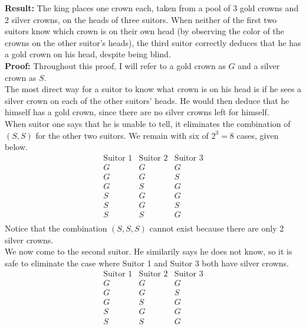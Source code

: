 \documentclass[11pt]{article}
\begin{document}
    \textbf{Result:} The king places one crown each, taken from a pool of 3 gold crowns and 2 silver crowns, on the heads of three suitors. When neither of the first two suitors know which crown is on their own head (by observing the color of the crowns on the other suitor's heads), the third suitor correctly deduces that he has a gold crown on his head, despite being blind.\\

    \textbf{Proof:} Throughout this proof, I will refer to a gold crown as $G$ and a silver crown as $S$.\\
    The most direct way for a suitor to know what crown is on his head is if he sees a silver crown on each of the other suitors' heads. He would then deduce that he himself has a gold crown, since there are no silver crowns left for himself. \\
    When suitor one says that he is unable to tell, it eliminates the combination of $(S, S)$ for the other two suitors. We remain with six of $2^3 = 8$ cases, given below.
    \begin{displaymath}
    \begin{array}{c|c|c}
    \text{Suitor 1} & \text{Suitor 2} & \text{Suitor 3} \\
    \hline
    G & G & G \\
    G & G & S \\
    G & S & G \\
    S & G & G \\
    S & G & S \\
    S & S & G \\
    \end{array}
    \end{displaymath}
    Notice that the combination $(S, S, S)$ cannot exist because there are only 2 silver crowns. \\
    We now come to the second suitor. He similarily says he does not know, so it is safe to eliminate the case where Suitor 1 and Suitor 3 both have silver crowns.
    \begin{displaymath}
    \begin{array}{c|c|c}
    \text{Suitor 1} & \text{Suitor 2} & \text{Suitor 3} \\
    \hline
    G & G & G \\
    G & G & S \\
    G & S & G \\
    S & G & G \\
    S & S & G \\
    \end{array}
    \end{displaymath}
\end{document}

